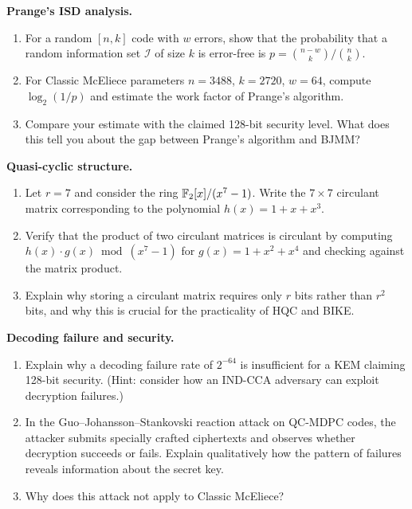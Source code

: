 \begin{prob}
\label{prob:ch09-isd}
\textbf{Prange's ISD analysis.}
\begin{enumerate}
\item[(a)] For a random $[n, k]$ code with $w$ errors, show that the probability that a random information set $\mathcal{I}$ of size $k$ is error-free is $p = \binom{n-w}{k}/\binom{n}{k}$.
\item[(b)] For Classic McEliece parameters $n = 3488$, $k = 2720$, $w = 64$, compute $\log_2(1/p)$ and estimate the work factor of Prange's algorithm.
\item[(c)] Compare your estimate with the claimed 128-bit security level.  What does this tell you about the gap between Prange's algorithm and BJMM?
\end{enumerate}
\end{prob}

\begin{prob}
\label{prob:ch09-qc}
\textbf{Quasi-cyclic structure.}
\begin{enumerate}
\item[(a)] Let $r = 7$ and consider the ring $\mathbb{F}_2[x]/(x^7 - 1)$.  Write the $7 \times 7$ circulant matrix corresponding to the polynomial $h(x) = 1 + x + x^3$.
\item[(b)] Verify that the product of two circulant matrices is circulant by computing $h(x) \cdot g(x) \bmod (x^7 - 1)$ for $g(x) = 1 + x^2 + x^4$ and checking against the matrix product.
\item[(c)] Explain why storing a circulant matrix requires only $r$ bits rather than $r^2$ bits, and why this is crucial for the practicality of HQC and BIKE.
\end{enumerate}
\end{prob}

\begin{prob}
\label{prob:ch09-dft}
\textbf{Decoding failure and security.}
\begin{enumerate}
\item[(a)] Explain why a decoding failure rate of $2^{-64}$ is insufficient for a KEM claiming 128-bit security.  (Hint: consider how an IND-CCA adversary can exploit decryption failures.)
\item[(b)] In the Guo--Johansson--Stankovski reaction attack on QC-MDPC codes, the attacker submits specially crafted ciphertexts and observes whether decryption succeeds or fails.  Explain qualitatively how the pattern of failures reveals information about the secret key.
\item[(c)] Why does this attack not apply to Classic McEliece?
\end{enumerate}
\end{prob}

